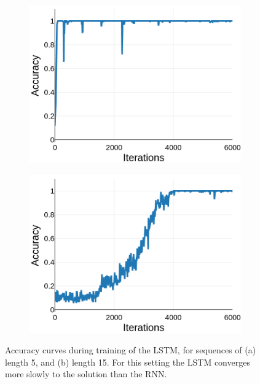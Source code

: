 \documentclass{article}
\begin{document}
\begin{figure}[t]
\begin{subfigure}{0.49\textwidth}
\centering
\includegraphics[scale=0.22]{img/lstm-acc-L5}
\caption{}
\end{subfigure}
\begin{subfigure}{0.49\textwidth}
\centering
\includegraphics[scale=0.22]{img/lstm-acc-L15}
\caption{}
\end{subfigure}
 \caption{Accuracy curves during training of the LSTM, for sequences of (a) length 5, and (b) length 15. For this setting the LSTM converges more slowly to the solution than the RNN.}
\label{fig:lstm_acc_curves}
\end{figure}
\end{document}
